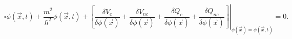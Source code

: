 \begin{equation}
\square\phi(\vec{x},t)+\frac{m^{2}}{\hbar^{2}}\phi(\vec{x},t)+\left.  \left[
\frac{\delta V_{c}}{\delta\phi(\vec{x})}+\frac{\delta V_{nc}}{\delta\phi
(\vec{x})}+\frac{\delta Q_{c}}{\delta\phi(\vec{x})}+\frac{\delta Q_{nc}%
}{\delta\phi(\vec{x})}\right]  \right|  _{\phi(\vec{x})=\phi(\vec{x}%
,t)}=0\text{. }\label{10}%
\end{equation}

